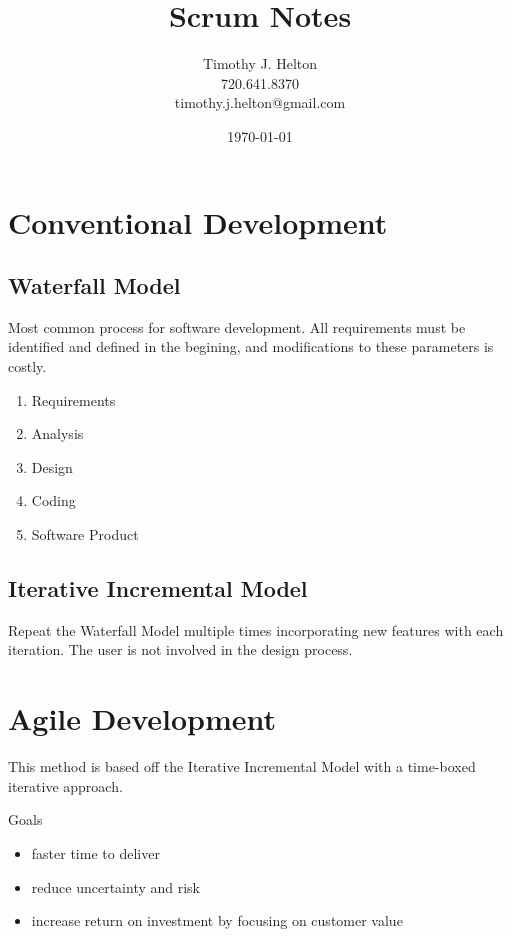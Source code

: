 \documentclass{article}
\newcommand{\mytitle}{Scrum Notes}
\begin{document}
\author{Timothy J. Helton\\720.641.8370\\timothy.j.helton@gmail.com}
\date{\today}
\title{\mytitle}

\maketitle
\newpage

\tableofcontents
\newpage

\listoffigures
\listoftables
\newpage

\section{Conventional Development}

\subsection{Waterfall Model}
Most common process for software development. All requirements must be
identified and defined in the begining, and modifications to these parameters
is costly.

\begin{enumerate}
  \item Requirements
  \item Analysis
  \item Design
  \item Coding
  \item Software Product
\end{enumerate}

\subsection{Iterative Incremental Model}
Repeat the Waterfall Model multiple times incorporating new features with each
iteration. The user is not involved in the design process.

\section{Agile Development}
This method is based off the Iterative Incremental Model with a time-boxed
iterative approach.

Goals
\begin{itemize}
  \item faster time to deliver
  \item reduce uncertainty and risk
  \item increase return on investment by focusing on customer value
\end{itemize}
\end{document}

